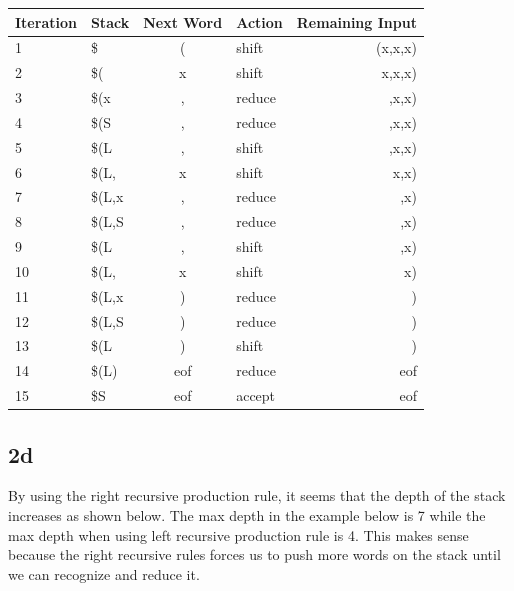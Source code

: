 \documentclass{article}
\begin{document}
    \begin{center}
        \begin{tabular}{ l l c l r }
            \hline
            Iteration   &   Stack   &   Next Word   &   Action  &   Remaining Input \\
            \hline
            1       &   \$          &   (   &   shift   &   (x,x,x)  \\
            2       &   \$(         &   x   &   shift   &   x,x,x)   \\
            3       &   \$(x        &   ,   &   reduce  &   ,x,x)    \\
            4       &   \$(S        &   ,   &   reduce  &   ,x,x)    \\
            5       &   \$(L        &   ,   &   shift   &   ,x,x)    \\
            6       &   \$(L,       &   x   &   shift   &   x,x)     \\
            7       &   \$(L,x      &   ,   &   reduce  &   ,x)      \\
            8       &   \$(L,S      &   ,   &   reduce  &   ,x)      \\
            9       &   \$(L        &   ,   &   shift   &   ,x)      \\
            10      &   \$(L,       &   x   &   shift   &   x)       \\
            11      &   \$(L,x      &   )   &   reduce  &   )        \\
            12      &   \$(L,S      &   )   &   reduce  &   )        \\
            13      &   \$(L        &   )   &   shift   &   )        \\
            14      &   \$(L)       &   eof &   reduce  &   eof      \\
            15      &   \$S         &   eof &   accept  &   eof      \\
        \end{tabular}
    \end{center}

    \subsection*{2d}
    By using the right recursive production rule, it seems that the depth of the stack increases as shown below. The max depth in the example below is 7 while the max depth when using left recursive production rule is 4. This makes sense because the right recursive rules forces us to push more words on the stack until we can recognize and reduce it.
\end{document}
